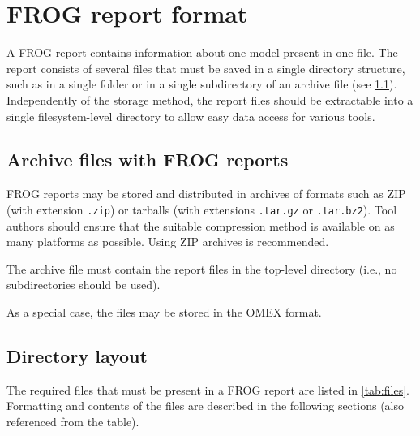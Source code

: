 \chapter{FROG report format}

A FROG report contains information about one model present in one file.
The report consists of several files that must be saved in a single directory structure, such as in a single folder or in a single subdirectory of an archive file (see \cref{sec:archives}).
Independently of the storage method, the report files should be extractable into a single filesystem-level directory to allow easy data access for various tools.

\section{Archive files with FROG reports}
\label{sec:archives}

FROG reports may be stored and distributed in archives of formats such as ZIP (with extension \texttt{.zip}) or tarballs (with extensions \texttt{.tar.gz} or \texttt{.tar.bz2}).
Tool authors should ensure that the suitable compression method is available on as many platforms as possible. Using ZIP archives is recommended.

The archive file must contain the report files in the top-level directory (i.e., no subdirectories should be used).

As a special case, the files may be stored in the OMEX format.

\section{Directory layout}
\label{sec:files}

The required files that must be present in a FROG report are listed in \cref{tab:files}. Formatting and contents of the files are described in the following sections (also referenced from the table).

